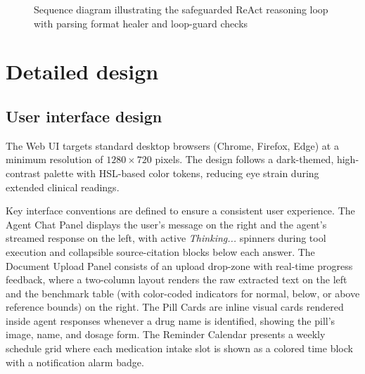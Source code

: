 \documentclass[../main.tex]{subfiles}
\begin{document}
\begin{figure}[H]
{%
    }
    \caption{Sequence diagram illustrating the safeguarded ReAct reasoning loop with parsing format healer and loop-guard checks}
    \label{fig:react_safeguards_sequence_diagram}
\end{figure}


\section{Detailed design}
\label{section:4.2}

\subsection{User interface design}
\label{subsection:4.2.1}

The Web UI targets standard desktop browsers (Chrome, Firefox, Edge) at a minimum resolution of $1280 \times 720$ pixels. The design follows a dark-themed, high-contrast palette with HSL-based color tokens, reducing eye strain during extended clinical readings.

Key interface conventions are defined to ensure a consistent user experience. The Agent Chat Panel displays the user's message on the right and the agent's streamed response on the left, with active \textit{Thinking...} spinners during tool execution and collapsible source-citation blocks below each answer. The Document Upload Panel consists of an upload drop-zone with real-time progress feedback, where a two-column layout renders the raw extracted text on the left and the benchmark table (with color-coded indicators for normal, below, or above reference bounds) on the right. The Pill Cards are inline visual cards rendered inside agent responses whenever a drug name is identified, showing the pill's image, name, and dosage form. The Reminder Calendar presents a weekly schedule grid where each medication intake slot is shown as a colored time block with a notification alarm badge.
\end{document}
